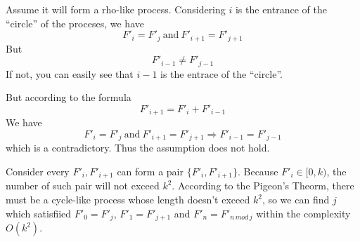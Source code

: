 Assume it will form a rho-like process. Considering $i$ is the entrance of the ``circle'' of the proceses, we have
\[F'_i = F'_j~\text{and}~F'_{i+1}=F'_{j+1}\]
But
\[F'_{i-1} \neq F'_{j-1}\]
If not, you can easily see that $i-1$ is the entrace of the ``circle''.

\noindent But according to the formula
\[F'_{i+1}=F'_{i}+F'_{i-1}\]
We have
\[F'_i = F'_j~\text{and}~F'_{i+1}=F'_{j+1} \Rightarrow F'_{i-1} = F'_{j-1}\]
which is a contradictory. Thus the assumption does not hold.

Consider every $F'_{i}, F'_{i+1}$ can form a pair $\{F'_i, F'_{i+1}\}$.
Because $F'_{i} \in [0, k)$, the number of such pair will not exceed $k^2$.
According to the Pigeon's Theorm, there must be a cycle-like process whose length doesn't exceed $k^2$,
so we can find $j$ which satisfiied $F'_{0} = F'_{j}$, $F'_{1} = F'_{j+1}$ and $F'_{n} = F'_{n\,mod\,j}$ within the complexity $O(k^2)$.
